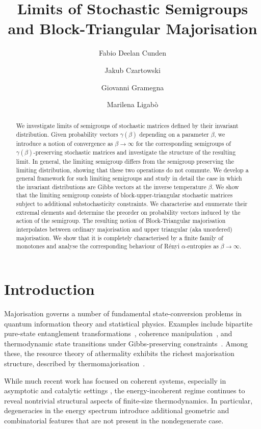 \documentclass[11pt,a4paper,longbibliography]{amsart}
\title[Limits of  Stochastic Semigroups and Block-Triangular Majorisation]{Limits of Stochastic Semigroups and Block-Triangular Majorisation}
\author[F.~D.~Cunden]{Fabio Deelan Cunden}
\author[J. Czartowski]{Jakub Czartowski}
\author[G.~Gramegna]{Giovanni Gramegna}
\author[M. Ligab\`o]{Marilena Ligab\`o}
\numberwithin{equation}{section}
\theoremstyle{plain}
\theoremstyle{definition}
\theoremstyle{remark}
\begin{document}
	
	\begin{abstract}  
		We investigate limits of semigroups of stochastic matrices defined by their invariant distribution. Given probability vectors $\gamma(\beta)$ depending on a parameter $\beta$, we introduce a notion of convergence as $\beta\to\infty$ for the corresponding semigroups of $\gamma(\beta)$-preserving stochastic matrices and investigate the structure of the resulting limit. In general, the limiting semigroup differs from the semigroup preserving the limiting distribution, showing that these two operations do not commute.
		We develop a general framework for such limiting semigroups and study in detail the case in which the invariant distributions are Gibbs vectors at the inverse temperature $\beta$. We show that the limiting semigroup consists of block-upper-triangular stochastic matrices subject to additional substochasticity constraints. We characterise and enumerate their extremal elements and determine the preorder on probability vectors induced by the action of the semigroup.
		The resulting notion of Block-Triangular majorisation interpolates between ordinary majorisation and upper triangular (aka unordered) majorisation. We show that it is completely characterised by a finite family of monotones and analyse the corresponding behaviour of R{\'e}nyi $\alpha$-entropies as $\beta\to\infty$.
	\end{abstract}
	
	\maketitle
	
	
	\section{Introduction}
	\label{sec:intro}
	Majorisation governs a number of fundamental state-conversion problems in quantum information theory and statistical physics. Examples include bipartite pure-state entanglement transformations~\cite{nielsen1999conditions}, coherence manipulation~\cite{baumgratz2014quantifying}, and thermodynamic state transitions under Gibbs-preserving constraints~\cite{horodecki2013fundamental}. Among these, the resource theory of athermality exhibits the richest majorisation structure, described by thermomajorisation~\cite{gour2015resource,deoliveirajunior2022}.
	
	While much recent work has focused on coherent systems, especially in asymptotic \cite{shiraishi2025recovery} and catalytic settings \cite{son2024hierarchy}, the energy-incoherent regime continues to reveal nontrivial structural aspects of finite-size thermodynamics. In particular, degeneracies in the energy spectrum introduce additional geometric and combinatorial features that are not present in the nondegenerate case.
	
\end{document}
